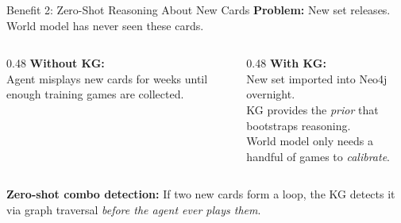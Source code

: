 \documentclass[aspectratio=169, 11pt]{beamer}
\begin{document}
\begin{frame}{Benefit 2: Zero-Shot Reasoning About New Cards}
  \textbf{Problem:} New set releases. World model has never seen these cards.

  \vspace{0.3cm}
  \begin{columns}[T]
    \begin{column}{0.48\textwidth}
      \textbf{Without KG:}\\
      Agent misplays new cards for weeks until enough training games are collected.
    \end{column}
    \begin{column}{0.48\textwidth}
      \textbf{With KG:}\\
      New set imported into Neo4j overnight.\\
      KG provides the \textit{prior} that bootstraps reasoning.\\
      World model only needs a handful of games to \textit{calibrate}.
    \end{column}
  \end{columns}

  \vspace{0.5cm}
  \textbf{Zero-shot combo detection:}
  If two new cards form a loop, the KG detects it via graph traversal \textit{before the agent ever plays them}.
\end{frame}
\end{document}
